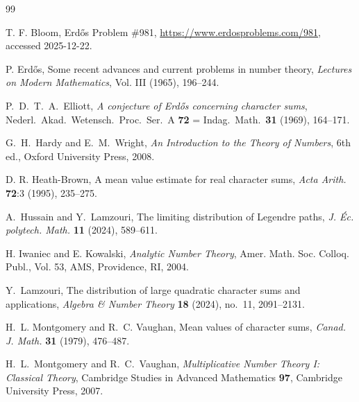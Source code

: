 \documentclass[11pt,letterpaper,reqno]{amsart}
\theoremstyle{definition}
\numberwithin{equation}{section}
\newcommand{\1}{\mathbf{1}}
\begin{document}
\begin{thebibliography}{99}

T. F. Bloom, Erd\H{o}s Problem \#981, \url{https://www.erdosproblems.com/981}, accessed 2025-12-22.

P. Erd\H{o}s, Some recent advances and current problems in number theory, \emph{Lectures on Modern Mathematics}, Vol. III (1965), 196--244.



P.~D.~T.~A.~Elliott,
\emph{A conjecture of Erd\H{o}s concerning character sums},
Nederl.\ Akad.\ Wetensch.\ Proc.\ Ser.\ A \textbf{72}
= Indag.\ Math.\ \textbf{31} (1969), 164--171.


G.~H.~Hardy and E.~M.~Wright, \emph{An Introduction to the Theory of Numbers}, 6th ed., Oxford University Press, 2008.

D. R. Heath-Brown, A mean value estimate for real character sums, \emph{Acta Arith.} \textbf{72}:3 (1995), 235--275.

A.~Hussain and Y.~Lamzouri, The limiting distribution of Legendre paths, \emph{J. \'{E}c. polytech. Math.} \textbf{11} (2024), 589--611.

H. Iwaniec and E. Kowalski, \emph{Analytic Number Theory}, Amer. Math. Soc. Colloq. Publ., Vol. 53, AMS, Providence, RI, 2004.

Y.~Lamzouri, The distribution of large quadratic character sums and applications, \emph{Algebra \& Number Theory} \textbf{18} (2024), no.~11, 2091--2131.

H.~L. Montgomery and R.~C. Vaughan, Mean values of character sums, \emph{Canad. J. Math.} \textbf{31} (1979), 476--487.

H.~L.~Montgomery and R.~C.~Vaughan, \emph{Multiplicative Number Theory I: Classical Theory}, Cambridge Studies in Advanced Mathematics \textbf{97}, Cambridge University Press, 2007.

\end{thebibliography}
\end{document}
